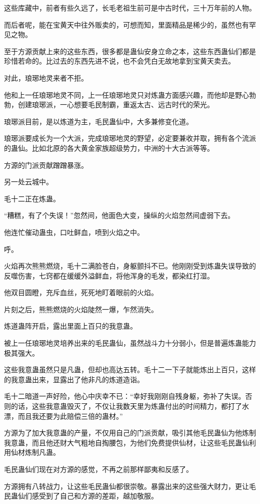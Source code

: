 \begin{this_body}
这些库藏中，前者有些久远了，长毛老祖生前可是中古时代，三十万年前的人物。

而后者呢，能在宝黄天中往外贩卖的，可想而知，里面精品是稀少的，虽然也有罕见之物。

至于方源贡献上来的这些东西，很多都是蛊仙安身立命之本，这些东西蛊仙们都是珍惜若命的。比过去的东西先进不说，也不会凭白无故地拿到宝黄天卖去。

对此，琅琊地灵来者不拒。

他和上一任琅琊地灵不同，上一任琅琊地灵只对炼蛊方面感兴趣，而他却是野心勃勃，创建琅琊派，一心想要毛民制霸，重返太古、远古时代的荣光。

琅琊派目前，是以炼道为主，毛民蛊仙中，大多兼修变化道。

琅琊派要成长为一个大派，完成琅琊地灵的野望，必定要兼收并取，拥有各个流派的蛊仙。比如北原的各大黄金家族超级势力，中洲的十大古派等等。

方源的门派贡献蹭蹭暴涨。

另一处云城中。

毛十二正在炼蛊。

“糟糕，有了个失误！”忽然间，他面色大变，操纵的火焰忽然间虚弱下去。

他连忙催动蛊虫，口吐鲜血，喷到火焰之中。

呼。

火焰再次熊熊燃烧，毛十二满脸苍白，身躯颤抖不已。他刚刚受到炼蛊失误导致的反噬伤害，七窍都在缓缓外溢鲜血，将他浑身的毛发，都染红打湿。

他双目圆瞪，充斥血丝，死死地盯着眼前的火焰。

片刻之后，熊熊燃烧的火焰陡然一爆，乍然消失。

炼道蛊阵开启，露出里面上百只的我意蛊。

被上一任琅琊地灵培养出来的毛民蛊仙，虽然战斗力十分弱小，但是普遍炼蛊能力极其强大。

这些我意蛊虽然只是凡蛊，但却也高达五转。毛十二一下子就能炼出上百只，这样的我意蛊出来，显露出了他非凡的炼道造诣。

毛十二暗道一声好险，他心中庆幸不已：“幸好我刚刚自残身躯，弥补了失误。否则的话，这些我意蛊毁灭了，不仅让我数天里为炼蛊付出的时间精力，都打了水漂，而且我还要为此赔偿三倍的蛊材。”

方源为了加大我意蛊的产量，不仅用自己的门派贡献，吸引其他毛民蛊仙为他炼制我意蛊，而且他还财大气粗地自掏腰包，为他们免费提供仙材，让这些毛民蛊仙利用仙材炼制凡蛊。

毛民蛊仙们现在对方源的感觉，不再之前那样鄙夷和反感了。

方源拥有八转战力，让这些毛民蛊仙都很崇敬。暴露出来的这些强大财力，更让毛民蛊仙们感受到了自己和方源的差距，越加敬服。


\end{this_body}
